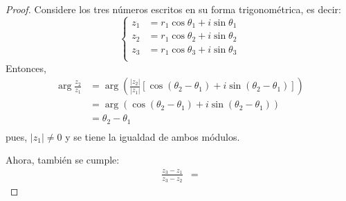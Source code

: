 \documentclass[12pt]{report}
\theoremstyle{largebreak}
\newcommand\abs[1]{\ensuremath{\left|#1\right|}}
\begin{document}
    \begin{proof}
        Considere los tres números escritos en su forma trigonométrica, es decir:
        \begin{equation*}
            \left\{
                \begin{split}
                    z_1&=r_1\cos\theta_1+i\sin\theta_1\\
                    z_2&=r_1\cos\theta_2+i\sin\theta_2\\
                    z_3&=r_1\cos\theta_3+i\sin\theta_3\\
                \end{split}
            \right.
        \end{equation*}
        Entonces,
        \begin{equation*}
            \begin{split}
                \arg\frac{z_2}{z_1}&=\arg\left(\frac{\abs{z_2}}{\abs{z_1}}\left[\cos\left(\theta_2-\theta_1\right)+i\sin\left(\theta_2-\theta_1\right)\right]\right) \\
                &=\arg\left(\cos\left(\theta_2-\theta_1\right)+i\sin\left(\theta_2-\theta_1\right)\right) \\
                &=\theta_2-\theta_1\\
            \end{split}
        \end{equation*}
        pues, $\abs{z_1}\neq0$ y se tiene la igualdad de ambos módulos.

        Ahora, también se cumple:
        \begin{equation*}
            \begin{split}
                \frac{z_3-z_1}{z_3-z_2}&=
            \end{split}
        \end{equation*}
    \end{proof}
    
    
\end{document}
